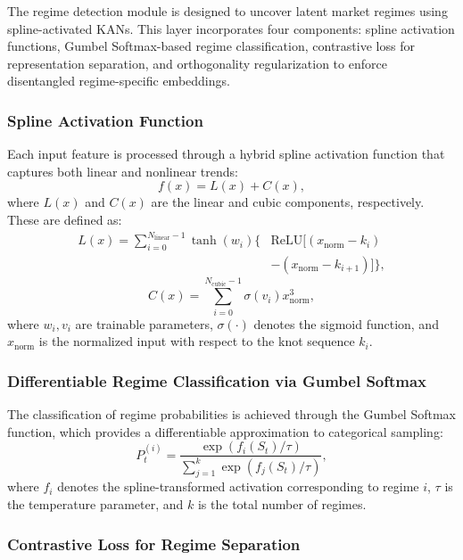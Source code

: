 \documentclass[conference,10pt]{IEEEtran}
\begin{document}
The regime detection module is designed to uncover latent market regimes using spline-activated KANs. This layer incorporates four components: spline activation functions, Gumbel Softmax-based regime classification, contrastive loss for representation separation, and orthogonality regularization to enforce disentangled regime-specific embeddings.

\subsubsection{Spline Activation Function}

Each input feature is processed through a hybrid spline activation function that captures both linear and nonlinear trends:
\begin{equation}
f(x) = L(x) + C(x),
\end{equation}
where $L(x)$ and $C(x)$ are the linear and cubic components, respectively. These are defined as:
\begin{align}
L(x) = \sum_{i=0}^{N_{\text{linear}}-1} \tanh(w_i) \big\{ & \text{ReLU}[(x_{\text{norm}} - k_i) \nonumber \\
& - (x_{\text{norm}} - k_{i+1})] \big\},
\end{align}
\begin{equation}
C(x) = \sum_{i=0}^{N_{\text{cubic}}-1} \sigma(v_i) x_{\text{norm}}^3,
\end{equation}
where $w_i, v_i$ are trainable parameters, $\sigma(\cdot)$ denotes the sigmoid function, and $x_{\text{norm}}$ is the normalized input with respect to the knot sequence $k_i$.

\subsubsection{Differentiable Regime Classification via Gumbel Softmax}

The classification of regime probabilities is achieved through the Gumbel Softmax function, which provides a differentiable approximation to categorical sampling:
\begin{equation}
P_t^{(i)} = \frac{\exp\left(f_i(S_t)/\tau\right)}{\sum_{j=1}^k \exp\left(f_j(S_t)/\tau\right)},
\end{equation}
where $f_i$ denotes the spline-transformed activation corresponding to regime $i$, $\tau$ is the temperature parameter, and $k$ is the total number of regimes.

\subsubsection{Contrastive Loss for Regime Separation}
\end{document}
